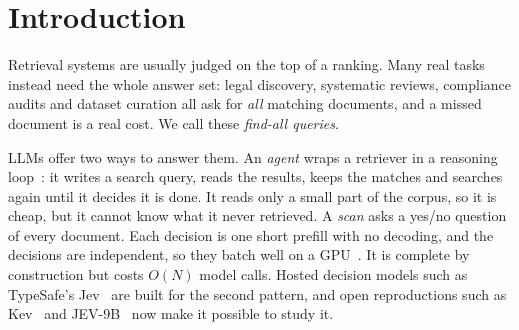 \documentclass[11pt]{article}
\begin{document}
\section{Introduction}

Retrieval systems are usually judged on the top of a ranking. Many real tasks
instead need the whole answer set: legal discovery, systematic reviews,
compliance audits and dataset curation all ask for \emph{all} matching
documents, and a missed document is a real cost. We call these
\emph{find-all queries}.

LLMs offer two ways to answer them. An \emph{agent} wraps a retriever in a
reasoning loop~\cite{yao2023react}: it writes a search query, reads the
results, keeps the matches and searches again until it decides it is done.
It reads only a small part of the corpus, so it is cheap, but it cannot know
what it never retrieved. A \emph{scan} asks a yes/no question of every
document. Each decision is one short prefill with no decoding, and the
decisions are independent, so they batch well on a GPU~\cite{kwon2023vllm}.
It is complete by construction but costs $O(N)$ model calls. Hosted decision
models such as TypeSafe's Jev~\cite{typesafe_jev} are built for the second
pattern, and open reproductions such as Kev~\cite{kev} and
JEV-9B~\cite{jev9b} now make it possible to study it.
\end{document}
